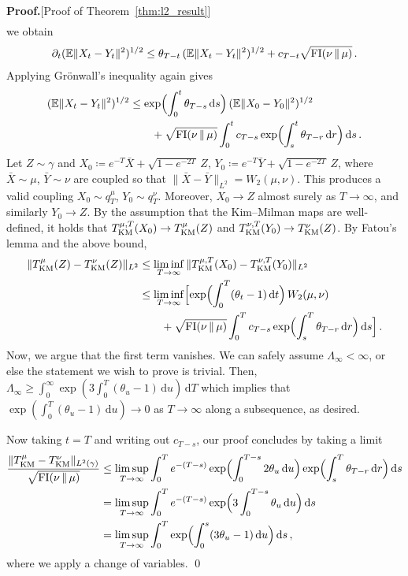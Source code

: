 \documentclass[12pt]{article}
\newcommand{\E}{\mathbb{E}}
\newcommand{\1}{\mathds{1}}
\newcommand*{\defeq}{\coloneqq}
\newcommand*{\rd}{\mathrm{d}}
\newcommand*{\dd}{\, \rd}
\newcommand{\mmid}{\,\Vert\,}
\def\defeq{\coloneqq} %
\renewenvironment{proof}{\noindent\textbf{Proof.}\hspace*{.3em}}{\qed \vspace{.1in}}
\theoremstyle{plain}
\theoremstyle{definition}
\theoremstyle{remark}
\begin{document}
\begin{proof}[Proof of Theorem~\ref{thm:l2_result}]
\begin{align*}
\end{align*}
we obtain
\begin{align*}
\partial_t (\E\|X_t - Y_t\|^2)^{1/2} \leq {\theta_{T-t}}\,(\E\|X_t - Y_t\|^2)^{1/2} + c_{T-t}\sqrt{{\rm FI}(\nu\mmid\mu)}\,.
\end{align*}
Applying Gr\"onwall's inequality again gives
\begin{align*}
(\E\|X_t-Y_t\|^2)^{1/2}
&\leq {\exp\Bigl(\int_0^t \theta_{T-s}\dd s\Bigr)\, (\E\|X_0-Y_0\|^2)^{1/2}} \\
&\qquad + \sqrt{{\rm FI}(\nu\mmid\mu)}\int_0^t c_{T-s}\exp\Bigl(\int_s^t {\theta_{T-r}} \dd r\Bigr) \dd s\,.
\end{align*}
{Let $Z \sim \gamma$ and $X_0 \defeq e^{-T} \bar X + \sqrt{1-e^{-2T}}\, Z$, $Y_0 \defeq e^{-T} \bar Y + \sqrt{1-e^{-2T}}\,Z$, where $\bar X \sim \mu$, $\bar Y\sim \nu$ are coupled so that $\|\bar X - \bar Y\|_{L^2} = W_2(\mu,\nu)$.
This produces a valid coupling $X_0\sim q_T^\mu$, $Y_0 \sim q_T^\nu$.
Moreover, $X_0 \to Z$ almost surely as $T\to\infty$, and similarly $Y_0 \to Z$.
By the assumption that the Kim--Milman maps are well-defined, it holds that $T_{\rm KM}^{\mu,T}(X_0) \to T_{\rm KM}^\mu(Z)$ and $T_{\rm KM}^{\nu,T}(Y_0) \to T_{\rm KM}^\nu(Z)$.
By Fatou's lemma and the above bound,
\begin{align*}
    \|T_{\rm KM}^\mu(Z) - T_{\rm KM}^\nu(Z)\|_{L^2}
    &\le \liminf_{T\to\infty} \|T_{\rm KM}^{\mu,T}(X_0) - T_{\rm KM}^{\nu,T}(Y_0)\|_{L^2} \\
    &\le \liminf_{T\to\infty}\Bigl[\exp\Bigl(\int_0^T (\theta_t -1)\dd t\Bigr)\,W_2(\mu,\nu) \\
    &\qquad{} + \sqrt{{\rm FI}(\nu\mmid\mu)}\int_0^T c_{T-s}\exp\Bigl(\int_s^T {\theta_{T-r}} \dd r\Bigr) \dd s\Bigr]\,.
\end{align*}
Now, we argue that the first term vanishes.
We can safely assume $\Lambda_\infty < \infty$, or else the statement we wish to prove is trivial.
Then, $\Lambda_\infty \ge \int_0^\infty \exp(3\int_0^T (\theta_u-1)\dd u)\dd T$ which implies that $\exp(\int_0^T (\theta_u-1)\dd u) \to 0$ as $T\to\infty$ along a subsequence, as desired.
}

{Now taking $t=T$ and writing out $c_{T-s}$, our proof concludes by taking a limit}
\begin{align*}
   {\frac{\|T_{\rm KM}^\mu - T_{\rm KM}^\nu\|_{L^2(\gamma)}}{\sqrt{{\rm FI}(\nu\mmid\mu)}}} &\leq {\limsup_{T\to\infty}} \int_0^T e^{-(T-s)}\exp\Bigl( \int_0^{T-s} 2\theta_u \dd u \Bigr) \exp\Bigl(\int_s^T {\theta_{T-r}} \dd r\Bigr) \dd s \\
   &= {\limsup_{T\to\infty}} \int_0^T e^{-(T-s)}\exp\Bigl(3 \int_0^{T-s} \theta_u \dd u \Bigr) \dd s \\
   &= {\limsup_{T\to\infty}\int_0^T \exp\Bigl( \int_0^s (3\theta_u-1) \dd u \Bigr) \dd s\,,}
\end{align*}
where we apply a change of variables.
\end{proof}
\end{document}
